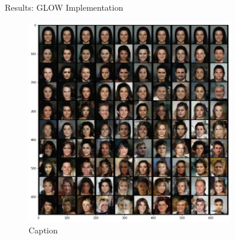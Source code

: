 \begin{frame}{Results: GLOW Implementation}
    \begin{figure}
        \centering
        \includegraphics[width=0.8\textwidth]{Images/celeb_multiple_stds2.png}
        \caption{Caption}
    \end{figure}
\end{frame}
